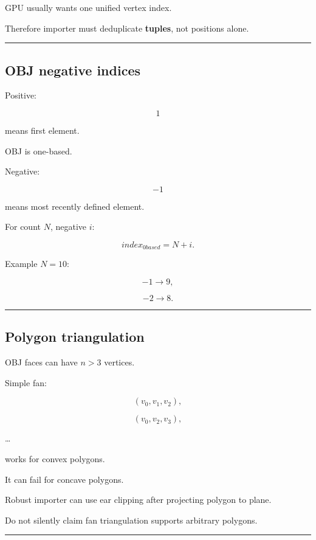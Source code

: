 GPU usually wants one unified vertex index.

Therefore importer must deduplicate \textbf{tuples}, not positions alone.

\begin{center}\rule{0.5\linewidth}{0.5pt}\end{center}

\subsection{OBJ negative indices}\label{04-visual-computing-ii-ch041-obj-negative-indices}

Positive:

\[
1
\]

means first element.

OBJ is one-based.

Negative:

\[
-1
\]

means most recently defined element.

For count \(N\), negative \(i\):

\[
\boxed{
index_{0based}
=
N+i.
}
\]

Example \(N=10\):

\[
-1\rightarrow9,
\]

\[
-2\rightarrow8.
\]

\begin{center}\rule{0.5\linewidth}{0.5pt}\end{center}

\subsection{Polygon triangulation}\label{04-visual-computing-ii-ch041-polygon-triangulation}

OBJ faces can have \(n>3\) vertices.

Simple fan:

\[
(v_0,v_1,v_2),
\]

\[
(v_0,v_2,v_3),
\]

\ldots{}

works for convex polygons.

It can fail for concave polygons.

Robust importer can use ear clipping after projecting polygon to plane.

Do not silently claim fan triangulation supports arbitrary polygons.

\begin{center}\rule{0.5\linewidth}{0.5pt}\end{center}

